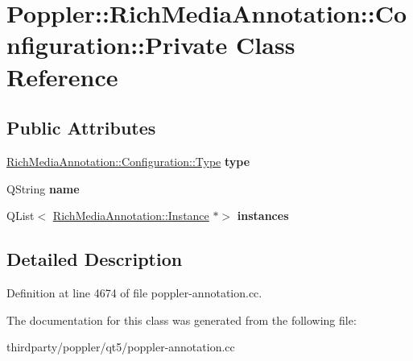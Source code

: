 \hypertarget{class_poppler_1_1_rich_media_annotation_1_1_configuration_1_1_private}{}\section{Poppler\+:\+:Rich\+Media\+Annotation\+:\+:Configuration\+:\+:Private Class Reference}
\label{class_poppler_1_1_rich_media_annotation_1_1_configuration_1_1_private}
\subsection*{Public Attributes}
\begin{DoxyCompactItemize}
\item 
\mbox{\label{class_poppler_1_1_rich_media_annotation_1_1_configuration_1_1_private_af6e08e63a95269ea6a1bd52fc8314db7}} 
\hyperlink{class_poppler_1_1_rich_media_annotation_1_1_configuration_a1ea5d0aa668b750c50d3c9ae53f31e3b}{Rich\+Media\+Annotation\+::\+Configuration\+::\+Type} {\bfseries type}
\item 
\mbox{\label{class_poppler_1_1_rich_media_annotation_1_1_configuration_1_1_private_ab503a8d9bbb23e269f3194678d068671}} 
Q\+String {\bfseries name}
\item 
\mbox{\label{class_poppler_1_1_rich_media_annotation_1_1_configuration_1_1_private_a5dd049b8d04859bdcbd316f5e836461d}} 
Q\+List$<$ \hyperlink{class_poppler_1_1_rich_media_annotation_1_1_instance}{Rich\+Media\+Annotation\+::\+Instance} $\ast$$>$ {\bfseries instances}
\end{DoxyCompactItemize}


\subsection{Detailed Description}


Definition at line 4674 of file poppler-\/annotation.\+cc.



The documentation for this class was generated from the following file\+:\begin{DoxyCompactItemize}
\item 
thirdparty/poppler/qt5/poppler-\/annotation.\+cc\end{DoxyCompactItemize}
